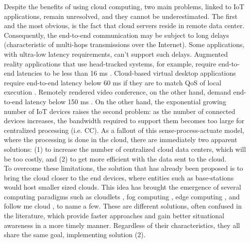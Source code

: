 \noindent\tab Despite the benefits of using cloud computing, two main problems, linked to IoT applications, remain unresolved, and they cannot be underestimated. The first and the most obvious, is the fact that cloud servers reside in remote data center. Consequently, the end-to-end communication may be subject to long delays (characteristic of multi-hops transmissions over the Internet). Some applications, with ultra-low latency requirements, can't support such delays. Augmented reality applications that use head-tracked systems, for example, require end-to-end latencies to be less than 16 ms \cite{ellis2004generalizeability}. Cloud-based virtual desktop applications require end-to-end latency below 60 ms if they are to match QoS of local execution \cite{taylor2015virtual}. Remotely rendered video conference, on the other hand, demand end-to-end latency below 150 ms \cite{szigeti2005end}. On the other hand, the exponential growing number of IoT devices raises the second problem: as the number of connected devices increases, the bandwidth required to support them becomes too large for centralized processing (i.e. CC). As a fallout of this sense-process-actuate model, where the processing is done in the cloud, there are immediately two apparent solutions: (1) to increase the number of centralized cloud data centers, which will be too costly, and (2) to get more efficient with the data sent to the cloud.\\
\noindent\tab To overcome these limitations, the solution that has already been proposed is to bring the cloud closer to the end devices, where entities such as base-stations would host smaller sized clouds. This idea has brought the emergence of several computing paradigms such as cloudlets \cite{satyanarayanan2013cloudlets}, fog computing \cite{bonomi2012fog}, edge computing \cite{davy2014challenges}, and follow me cloud \cite{taleb2013follow}, to name a few. These are different solutions, often confused in the literature, which provide faster approaches and gain better situational awareness in a more timely manner. Regardless of their characteristics, they all share the same goal, implementing solution (2).\\

